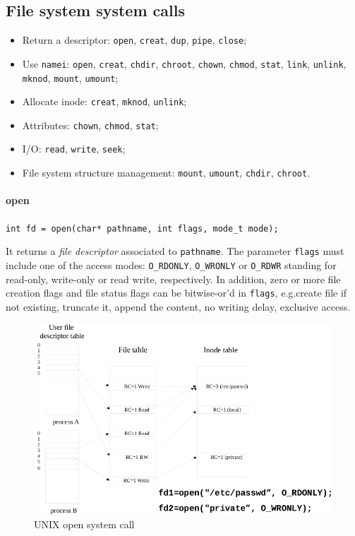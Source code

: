 \documentclass{report}
\begin{document}
\subsection{File system system calls}
\begin{itemize}
\item Return a descriptor: \texttt{open}, \texttt{creat}, \texttt{dup}, \texttt{pipe}, \texttt{close};
\item Use \texttt{namei}: \texttt{open}, \texttt{creat}, \texttt{chdir}, \texttt{chroot}, \texttt{chown}, \texttt{chmod}, \texttt{stat}, \texttt{link}, \texttt{unlink}, \texttt{mknod}, \texttt{mount}, \texttt{umount};
\item Allocate inode: \texttt{creat}, \texttt{mknod}, \texttt{unlink};
\item Attributes: \texttt{chown}, \texttt{chmod}, \texttt{stat};
\item I/O: \texttt{read}, \texttt{write}, \texttt{seek};
\item File system structure management: \texttt{mount}, \texttt{umount}, \texttt{chdir}, \texttt{chroot}.
\end{itemize}

\paragraph{open} \texttt{int fd = open(char* pathname, int flags, mode\_t mode);}

It returns a \emph{file descriptor} associated to \texttt{pathname}. The parameter \texttt{flags} must include one of the access modes: \texttt{O\_RDONLY}, \texttt{O\_WRONLY} or \texttt{O\_RDWR} standing for read-only, write-only or read write, respectively. In addition, zero or more file creation flags and file status flags can be bitwise-or'd in \texttt{flags}, e.g.\@ create file if not existing, truncate it, append the content, no writing delay, exclusive access.

\begin{figure}[hbtp]
\centering
\includegraphics[scale=0.4]{images/file_system/open_system_call.jpg}
\caption{UNIX open system call}
\end{figure}
\end{document}
